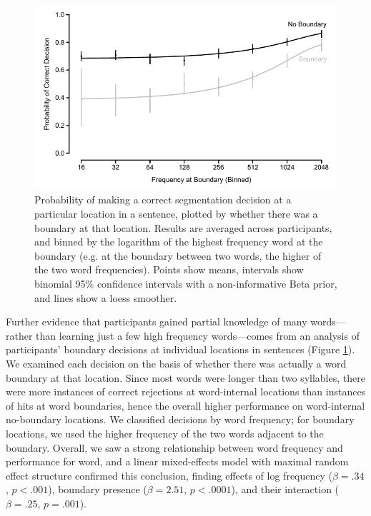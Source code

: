 \documentclass[10pt]{article}
\begin{document}
\begin{figure}[t]
\begin{center}
\includegraphics{figures/boundary_freqs_col.pdf}
\caption{\label{fig:freq} Probability of making a correct segmentation decision at a particular location in a sentence, plotted by whether there was a boundary at that location. Results are averaged across participants, and binned by the logarithm of the highest frequency word at the boundary (e.g. at the boundary between two words, the higher of the two word frequencies). Points show means, intervals show binomial 95\% confidence intervals with a non-informative Beta prior, and lines show a loess smoother.}
\end{center}
\end{figure}

Further evidence that participants gained partial knowledge of many words---rather than learning just a few high frequency words---comes from an analysis of participants' boundary decisions at individual locations in sentences (Figure \ref{fig:freq}). We examined each decision on the basis of whether there was actually a word boundary at that location. Since most words were longer than two syllables, there were more instances of correct rejections at word-internal locations than instances of hits at word boundaries, hence the overall higher performance on word-internal no-boundary locations. We classified decisions by word frequency; for boundary locations, we used the higher frequency of the two words adjacent to the boundary. Overall, we saw a strong relationship between word frequency and performance for word, and a linear mixed-effects model \cite{gelman2006} with maximal random effect structure confirmed this conclusion, finding effects of log frequency ($\beta = .34$, $p < .001$), boundary presence ($\beta = 2.51$, $p < .0001$), and their interaction ($\beta = .25$, $p = .001$). 
\end{document}
